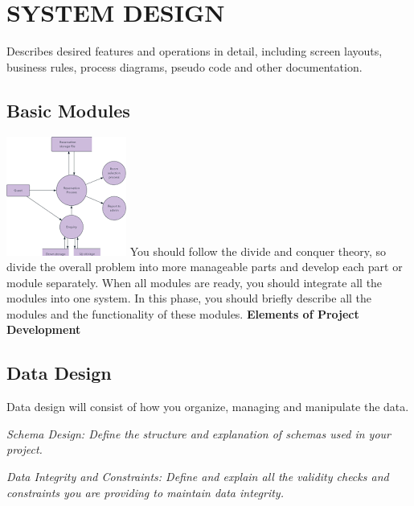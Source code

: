 
\chapter{SYSTEM DESIGN} %

\label{Chapter4} %


Describes desired features and operations in detail, including screen layouts, business rules, process diagrams, pseudo code and other documentation.
\section{Basic Modules}

\includegraphics{Pictures/save.png}
You should follow the divide and conquer theory, so divide the overall problem into more manageable parts and develop each part or module separately. When all modules are ready, you should integrate all the modules into one system. In this phase, you should briefly describe all the modules and the functionality of these modules.
\textbf{Elements of Project Development}

\section{Data Design}
Data design will consist of how you organize, managing and manipulate the data.

\textit{Schema Design: Define the structure and explanation of schemas used in your project.}

\textit{Data Integrity and Constraints: Define and explain all the validity checks and constraints you are providing to maintain data integrity.}

